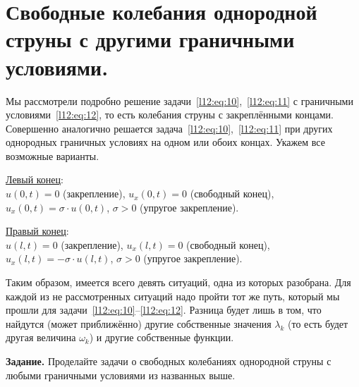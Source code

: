 \documentclass[12pt,a4paper,openany,fleqn]{book}
\theoremstyle{definition}
\begin{document}
\section[Свободные колебания однородной струны с другими г. у.]{Свободные колебания однородной струны с другими граничными условиями.}
\label{lecture11section4}
Мы рассмотрели подробно решение задачи~\eqref{l12:eq:10},~\eqref{l12:eq:11} с граничными условиями~\eqref{l12:eq:12}, то есть колебания струны с закреплёнными концами. Совершенно аналогично решается задача~\eqref{l12:eq:10},~\eqref{l12:eq:11} при других однородных граничных условиях на одном или обоих концах. Укажем все возможные варианты.
\vspace{0,4cm}

\noindent\underline{Левый конец}:\\[4pt]
$u(0,t)=0$ (закрепление), $u_x(0,t)=0$ (свободный конец), $u_x(0,t)=\sigma\cdot u(0,t)$, $\sigma>0$ (упругое закрепление).
\vspace{0,2cm}

\noindent\underline{Правый конец}:\\[4pt]  
$u(l,t)=0$ (закрепление), $u_x(l,t)=0$ (свободный конец), $u_x(l,t)=-\sigma\cdot u(l,t)$, $\sigma>0$ (упругое закрепление).
\vspace{0,4cm}

Таким образом, имеется всего девять ситуаций, одна из которых разобрана. Для каждой из не рассмотренных ситуаций надо пройти тот же путь, который мы прошли для задачи~\eqref{l12:eq:10}--\eqref{l12:eq:12}. Разница будет лишь в том, что найдутся (может приближённо) другие собственные значения $\lambda_k$  (то есть будет другая величина $\omega_k$) и другие собственные функции.
\vspace{0,2cm}

\noindent\textbf{Задание. }Проделайте задачи о свободных колебаниях однородной струны с любыми граничными условиями из названных выше.
\end{document}
